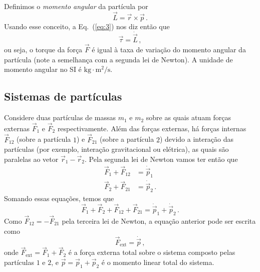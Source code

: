 \documentclass[twocolumn=on,DIV=calc]{scrartcl}
\theoremstyle{definition}
\begin{document}
Definimos o \textit{momento angular} da partícula por
$$\vec L=\vec r\times\vec p\,.$$
Usando esse conceito, a Eq.~(\ref{eq:3}) nos diz então que
\begin{equation}
  \label{eq:4}
  \vec\tau=\dot{\vec L}\,,
\end{equation}
ou seja, o torque da força $\vec F$ é igual à taxa de variação do
momento angular da partícula (note a semelhança com a segunda lei de
Newton). A unidade de momento angular no SI é
$\mathrm{kg}\cdot\mathrm{m^2/s}$.

\subsection{Sistemas de partículas}
Considere duas partículas de massas $m_1$ e $m_2$ sobre as quais atuam
forças externas $\vec F_1$ e $\vec F_2$ respectivamente. Além
das forças externas, há forças internas $\vec F_{12}$ (sobre a
partícula $1$) e $\vec F_{21}$ (sobre a partícula $2$) devido a
interação das partículas (por exemplo, interação gravitacional ou
elétrica), as quais são paralelas ao vetor
$\vec r_1-\vec r_2$. Pela segunda lei de Newton vamos ter
então que
\begin{equation}
  \label{eq:5}
  \begin{split}
    \vec F_1+\vec F_{12}&=\dot{\vec p}_1\\
    \vec F_2+\vec F_{21}&=\dot{\vec p}_2\,.
  \end{split}
\end{equation}
Somando essas equações, temos que
$$\vec F_1+\vec F_2+\vec F_{12}+\vec F_{21}=\dot{\vec p}_1+\dot{\vec p}_2\,.$$
Como $\vec F_{12}=-\vec F_{21}$ pela terceira lei de Newton, a
equação anterior pode ser escrita como
\begin{equation}
  \label{eq:6}
  \vec F_{\mathrm{ext}}=\dot{\vec p}\,,
\end{equation}
onde $\vec F_{\mathrm{ext}}=\vec F_1+\vec F_2$ é a força
externa total sobre o sistema composto pelas partículas $1$ e $2$, e
$\vec p=\vec p_1+\vec p_2$ é o momento linear total do
sistema.
\end{document}

